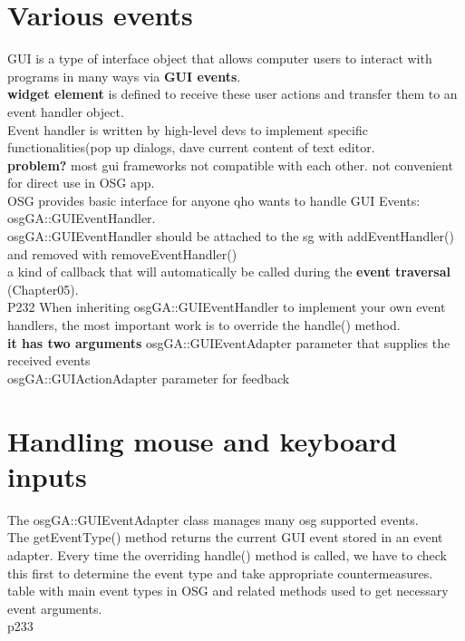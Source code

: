 \documentclass[a4paper,12pt]{book}
\begin{document}
\section{Various events}
GUI is a type of interface object that allows computer users to interact with programs in many ways via \textbf{GUI events}.\\
\textbf{widget element} is defined to receive these user actions and transfer them to an event handler object.\\
Event handler is written by high-level devs to implement specific functionalities(pop up dialogs, dave current content of text editor.\\
\textbf{problem?} most gui frameworks not compatible with each other. \textrightarrow not convenient for direct use in OSG app.\\
\textrightarrow OSG provides basic interface for anyone qho wants to handle GUI Events: osgGA::GUIEventHandler.\\
osgGA::GUIEventHandler should be attached to the sg with addEventHandler() and removed with removeEventHandler()\\
\textrightarrow a kind of callback that will automatically be called during the \textbf{event traversal} (Chapter05).\\

P232 When inheriting osgGA::GUIEventHandler to implement your own event handlers, the most important work is to override the handle() method.\\
\textbf{it has two arguments}
\textrightarrow osgGA::GUIEventAdapter parameter that supplies the received events\\
\textrightarrow osgGA::GUIActionAdapter parameter for feedback

\section{Handling mouse and keyboard inputs}
The osgGA::GUIEventAdapter class manages many osg supported events.\\
The getEventType() method returns the
current GUI event stored in an event adapter. Every time the overriding handle() method
is called, we have to check this first to determine the event type and take appropriate
countermeasures.\\

table with main event types in OSG and related methods used to get necessary event arguments.\\
\textrightarrow p233\\
\end{document}
